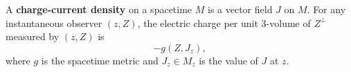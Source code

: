 A \textbf{charge-current density} on a spacetime $M$ is a vector field $J$ on $M$. For any instantaneous observer $(z, Z)$, the electric charge per unit 3-volume of $Z^\perp$ measured by $(z, Z)$ is
$$-g(Z, J_z),$$
where $g$ is the spacetime metric and $J_z \in M_z$ is the value of $J$ at $z$.
